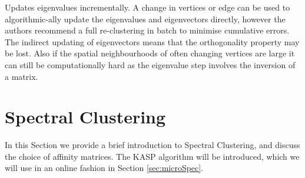 \documentclass[12pt]{report}		%
\begin{document}

 \cite{Ning2007} \cite{Ning2010} Updates eigenvalues incrementally. A change in vertices or edge can be used to algorithmic-ally update the eigenvalues and eigenvectors directly, however the authors recommend a full re-clustering in batch to minimise cumulative errors. The indirect updating of eigenvectors means that the orthogonality property may be lost. Also if the spatial neighbourhoods of often changing vertices are large it can still be computationally hard as the eigenvalue step involves the inversion of a matrix.




\section{Spectral Clustering}
\label{sec:spec}

In this Section we provide a brief introduction to Spectral Clustering, and discuss the choice of affinity matrices. The KASP \cite{Yan2009} algorithm will be introduced, which we will use in an online fashion in Section \ref{sec:microSpec}.
\end{document}
